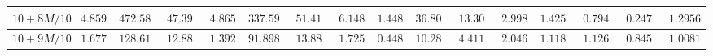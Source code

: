 \begin{landscape}
\begin{tabular}{|c|c|c|c|c|c|c|c|c|c|c|c|c|c|c|c}
$10 + 8M/10$ & $4.8590$                                                        & $472.5872$                                                      & $47.3930$                                                         & $4.8659$                                                           & $337.5925$                                                            & $51.4150$                                                       & $6.1487$                                                          & $1.4483$                                                           & $36.8062$                                                             & $13.3006$                                                       & $2.9984$                                                          & $1.4253$                                                        & $0.79462$                                                          & $0.24765$                                                           & \multicolumn{1}{c|}{$1.29567$}                                                              \\ \hline
$10 + 9M/10$ & $1.6771$                                                        & $128.6127$                                                      & $12.8898$                                                         & $1.3923$                                                           & $91.8983$                                                             & $13.8856$                                                       & $1.7250$                                                          & $0.4481$                                                           & $10.2870$                                                             & $4.4118$                                                        & $2.0468$                                                          & $1.11841$                                                        & $1.1269$                                                          & $0.84543$                                                           & $1.00813$                                                                                   \\ \hline 
\end{tabular}
\end{landscape}

